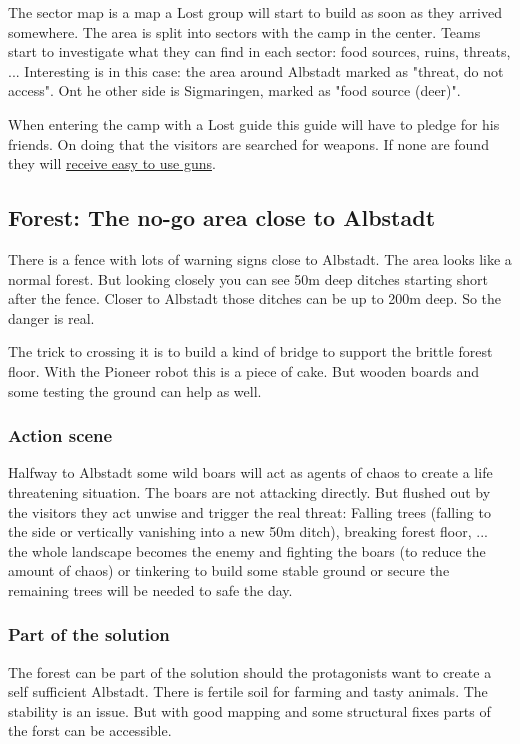 The sector map is a map a Lost group will start to build as soon as they arrived somewhere. The area is split into sectors with the camp in the center. Teams start to investigate what they can find in each sector: food sources, ruins, threats, ... Interesting is in this case: the area around Albstadt marked as "threat, do not access". Ont he other side is Sigmaringen, marked as "food source (deer)".

When entering the camp with a Lost guide this guide will have to pledge for his friends. On doing that the visitors are searched for weapons. If none are found they will \hyperref[sec:Lost guests and weapons]{receive easy to use guns}.

\subsection{Forest: The no-go area close to Albstadt}

There is a fence with lots of warning signs close to Albstadt. The area looks like a normal forest. But looking closely you can see 50m deep ditches starting short after the fence. Closer to Albstadt those ditches can be up to 200m deep. So the danger is real.

The trick to crossing it is to build a kind of bridge to support the brittle forest floor. With the Pioneer robot this is a piece of cake. But wooden boards and some testing the ground can help as well.


\subsubsection{Action scene}

Halfway to Albstadt some wild boars will act as agents of chaos to create a life threatening situation. The boars are not attacking directly. But flushed out by the visitors they act unwise and trigger the real threat: Falling trees (falling to the side or vertically vanishing into a new 50m ditch), breaking forest floor, ...
the whole landscape becomes the enemy and fighting the boars (to reduce the amount of chaos) or tinkering to build some stable ground or secure the remaining trees will be needed to safe the day.

\subsubsection{Part of the solution}

The forest can be part of the solution should the protagonists want to create a self sufficient Albstadt. There is fertile soil for farming and tasty animals. The stability is an issue. But with good mapping and some structural fixes parts of the forst can be accessible.

